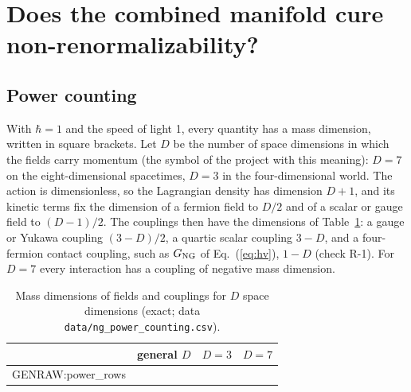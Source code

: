 \section{Does the combined manifold cure non-renormalizability?}
\label{sec:renorm}

\subsection{Power counting}

With $\hbar=1$ and the speed of light 1, every quantity has a mass dimension, written in square
brackets. Let $D$ be the number of space dimensions in which the fields carry momentum (the symbol of
the project with this meaning): $D=7$ on the eight-dimensional spacetimes, $D=3$ in the
four-dimensional world. The action is dimensionless, so the Lagrangian density has dimension $D+1$,
and its kinetic terms fix the dimension of a fermion field to $D/2$ and of a scalar or gauge field to
$(D-1)/2$. The couplings then have the dimensions of Table~\ref{tab:powercount}: a gauge or Yukawa
coupling $(3-D)/2$, a quartic scalar coupling $3-D$, and a four-fermion contact coupling, such as
$G_{\rm NG}$ of Eq.~(\ref{eq:hv}), $1-D$ (check R-1). For $D=7$ every interaction has a coupling of
negative mass dimension.

\begin{table}[t]
\caption{Mass dimensions of fields and couplings for $D$ space dimensions (exact; data
\texttt{data/ng\_power\_counting.csv}).}
\label{tab:powercount}
\begin{ruledtabular}
\begin{tabular}{lccc}
& general $D$ & $D=3$ & $D=7$\\
\hline
{{GENRAW:power_rows}}
\end{tabular}
\end{ruledtabular}
\end{table}

